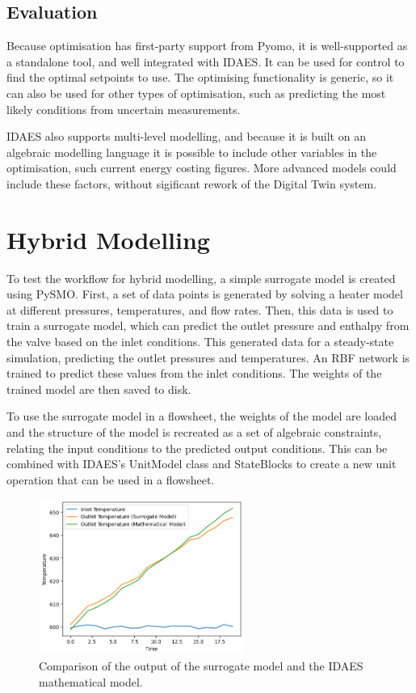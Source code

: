 \documentclass[12pt]{article}
\begin{document}
\subsection{Evaluation}


Because optimisation has first-party support from Pyomo, it is well-supported as a standalone tool, and well integrated with IDAES.  It can be used for control to find the optimal setpoints to use. The optimising functionality is generic, so it can also be used for other types of optimisation, such as predicting the most likely conditions from uncertain measurements.

IDAES also supports multi-level modelling, and because it is built on an algebraic modelling language it is possible to include other variables in the optimisation, such current energy costing figures. More advanced models could include these factors, without sigificant rework of the Digital Twin system.


\section{Hybrid Modelling}

To test the workflow for hybrid modelling, a simple surrogate model is created using PySMO. First, a set of data points is generated by solving a heater model at different pressures, temperatures, and flow rates. 
Then, this data is used to train a surrogate model, which can predict the outlet pressure and enthalpy from the valve based on the inlet conditions. 
This generated data for a steady-state simulation, predicting the outlet pressures and temperatures. 
An RBF network is trained to predict these values from the inlet conditions.
The weights of the trained model are then saved to disk. 

To use the surrogate model in a flowsheet, the weights of the model are loaded and the structure of the model is recreated as a set of algebraic constraints, relating the input conditions to the predicted output conditions. This can be combined with IDAES's UnitModel class and StateBlocks to create a new unit operation that can be used in a flowsheet.


\begin{figure}[h]
    \centering
    \includegraphics[width=0.6\textwidth]{surrogate_model_accuracy.png}
    \caption{Comparison of the output of the surrogate model and the IDAES mathematical model.}
    \label{fig:surrogate_model}
\end{figure}
\end{document}
